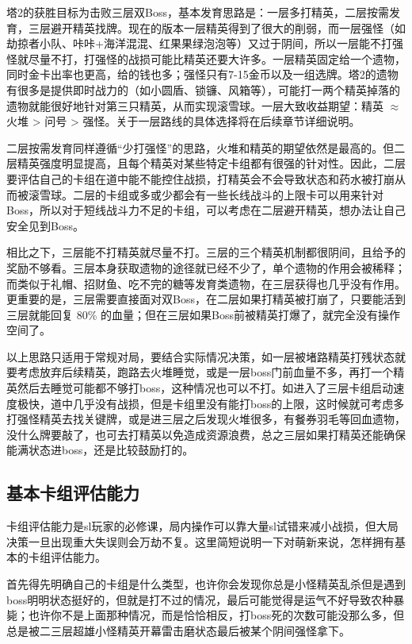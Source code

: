 \documentclass[12pt, a4paper]{article}
\begin{document}
塔2的获胜目标为击败三层双Boss，基本发育思路是：一层多打精英，二层按需发育，三层避开精英找牌。现在的版本一层精英得到了很大的削弱，而一层强怪（如劫掠者小队、咔咔+海洋混混、红果果绿泡泡等）又过于阴间，所以一层能不打强怪就尽量不打，打强怪的战损可能比精英还要大许多。一层精英固定给一个遗物，同时金卡出率也更高，给的钱也多；强怪只有7-15金币以及一组选牌。塔2的遗物有很多是提供即时战力的（如小圆盾、锁镰、风箱等），可能打一两个精英掉落的遗物就能很好地针对第三只精英，从而实现滚雪球。一层大致收益期望：精英 $\approx$ 火堆 \textgreater{} 问号 \textgreater{} 强怪。关于一层路线的具体选择将在后续章节详细说明。

二层按需发育同样遵循“少打强怪”的思路，火堆和精英的期望依然是最高的。但二层精英强度明显提高，且每个精英对某些特定卡组都有很强的针对性。因此，二层要评估自己的卡组在道中能不能控住战损，打精英会不会导致状态和药水被打崩从而被滚雪球。二层的卡组或多或少都会有一些长线战斗的上限卡可以用来针对Boss，所以对于短线战斗力不足的卡组，可以考虑在二层避开精英，想办法让自己安全见到Boss。

相比之下，三层能不打精英就尽量不打。三层的三个精英机制都很阴间，且给予的奖励不够看。三层本身获取遗物的途径就已经不少了，单个遗物的作用会被稀释；而类似于礼帽、招财鱼、吃不完的糖等发育类遗物，在三层获得也几乎没有作用。更重要的是，三层需要直接面对双Boss，在二层如果打精英被打崩了，只要能活到三层就能回复 80\% 的血量；但在三层如果Boss前被精英打爆了，就完全没有操作空间了。

以上思路只适用于常规对局，要结合实际情况决策，如一层被堵路精英打残状态就要考虑放弃后续精英，跑路去火堆睡觉，或是一层boss门前血量不多，再打一个精英然后去睡觉可能都不够打boss，这种情况也可以不打。如进入了三层卡组启动速度极快，道中几乎没有战损，但是卡组里没有能打boss的上限，这时候就可考虑多打强怪精英去找关键牌，或是进三层之后发现火堆很多，有餐券羽毛等回血遗物，没什么牌要敲了，也可去打精英以免造成资源浪费，总之三层如果打精英还能确保能满状态进boss，还是比较鼓励打的。

\subsection{基本卡组评估能力}
卡组评估能力是sl玩家的必修课，局内操作可以靠大量sl试错来减小战损，但大局决策一旦出现重大失误则会万劫不复。这里简短说明一下对萌新来说，怎样拥有基本的卡组评估能力。

首先得先明确自己的卡组是什么类型，也许你会发现你总是小怪精英乱杀但是遇到boss明明状态挺好的，但就是打不过的情况，最后可能觉得是运气不好导致农种暴毙；也许你不是上面那种情况，而是恰恰相反，打boss死的次数可能没那么多，但总是被二三层超雄小怪精英开幕雷击磨状态最后被某个阴间强怪拿下。
\end{document}

